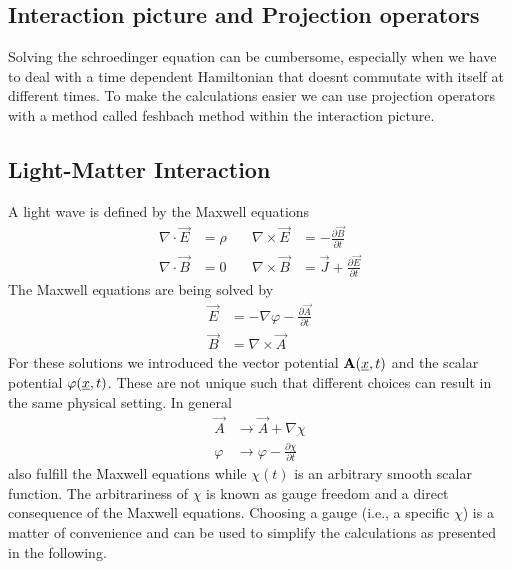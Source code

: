 \subsection{Interaction picture and Projection operators}
Solving the schroedinger equation can be cumbersome, especially when we have to deal with a time dependent Hamiltonian that doesnt commutate with itself at different times.
To make the calculations easier we can use projection operators with a method called feshbach method within the interaction picture.




\subsection{Light-Matter Interaction}
A light wave is defined by the Maxwell equations
\begin{equation*}
    \begin{aligned}
        \nabla \cdot \vec{E} &= \rho \quad & \nabla \times \vec{E} &= -\frac{\partial \vec{B}}{\partial t} \\
        \nabla \cdot \vec{B} &= 0 \quad & \nabla \times \vec{B} &= \vec{J} + \frac{\partial \vec{E}}{\partial t}
    \end{aligned}
\end{equation*}
The Maxwell equations are being solved by
\begin{equation}
    \begin{aligned}
        \vec{E} &= -\nabla \varphi - \frac{\partial \vec{A}}{\partial t}\\ \label{eq:potentials}
        \vec{B} &= \nabla \times \vec{A}
    \end{aligned}
\end{equation}
For these solutions we introduced the vector potential $\mathbf{A}(\underline{x}, t)$ and the scalar potential $\varphi(\underline{x}, t)$. 
These are not unique such that different choices can result in the same physical setting. In general
\begin{equation*}
    \begin{aligned}
        \vec{A} &\to \vec{A} + \nabla \chi \\
        \varphi &\to \varphi - \frac{\partial \chi }{\partial t}   
    \end{aligned}
\end{equation*}
also fulfill the Maxwell equations while $\chi(t)$ is an arbitrary smooth scalar function. The arbitrariness of $\chi$ is known as gauge freedom and a direct consequence of the Maxwell equations.
Choosing a gauge (i.e., a specific $\chi$) is a matter of convenience and can be used to simplify the calculations as presented in the following.









